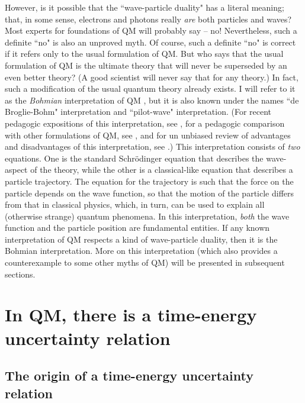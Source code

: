 \documentclass[12pt]{article}
\begin{document}
However, is it possible that the ``wave-particle duality" has a 
literal meaning; that, in some sense, electrons and photons 
really {\em are} both particles and waves? Most experts 
for foundations of QM will probably say -- no! Nevertheless, 
such a definite ``no" is also an unproved myth.
Of course, such a definite ``no" is correct if it refers only 
to the usual formulation of QM. But who says that the usual 
formulation of QM is the ultimate theory that will never be 
superseded by an even better theory? (A good scientist will 
never say that for any theory.) 
In fact, such a modification of the usual quantum theory already 
exists. I will refer to it as the {\em Bohmian} interpretation 
of QM \cite{bohm}, but it is also known under the names 
``de Broglie-Bohm" interpretation and ``pilot-wave" interpretation.
(For recent pedagogic expositions of this interpretation, see
\cite{tumul,pas}, for a pedagogic comparison with other formulations 
of QM, see \cite{mnogoAJP}, and for un unbiased review 
of advantages and disadvantages of this interpretation,
see \cite{pas2}.)
This interpretation consists of {\em two} equations. One is the 
standard Schr\"odinger equation that describes the wave-aspect
of the theory, while the other is a classical-like equation that 
describes a particle trajectory. The equation for the 
trajectory is such that the force on the particle depends on the 
wave function, so that the motion of the particle differs 
from that in classical physics, which, in turn, can be used to explain
all (otherwise strange) quantum phenomena. In this interpretation, 
{\em both} 
the wave function and the particle position are fundamental 
entities. If any known interpretation of QM respects 
a kind of wave-particle duality, then it is the Bohmian interpretation.
More on this interpretation (which also provides a counterexample 
to some other myths of QM) will be presented in subsequent sections.   

\section{In QM, there is a time-energy uncertainty relation}

\subsection{The origin of a time-energy uncertainty relation}
\end{document}
